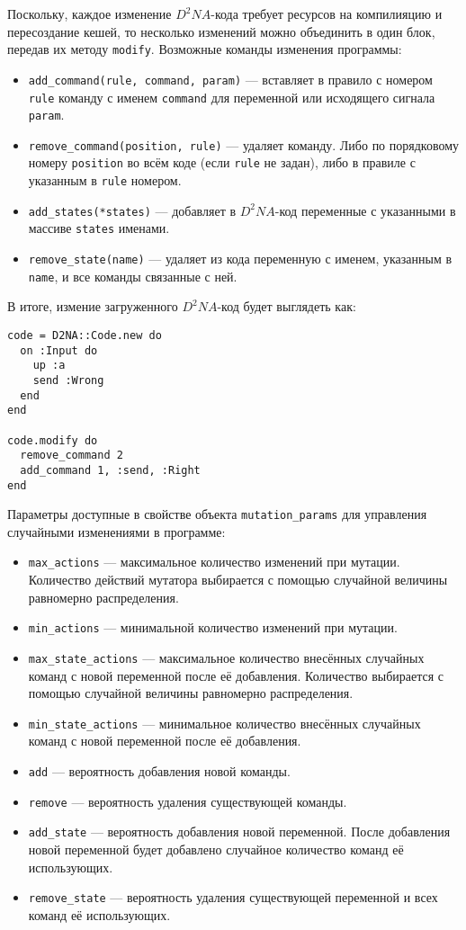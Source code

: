 \documentclass[utf8,a5paper,portrait,10pt,twoside]{eskdtext}
\begin{document}
Поскольку, каждое изменение $D^2NA$-кода требует ресурсов на компилияцию и
пересоздание кешей, то несколько изменений можно объединить в один блок, передав
их методу \texttt{modify}. Возможные команды изменения программы:
\begin{itemize}
  \item \texttt{add\_command(rule, command, param)} — вставляет в
        правило с номером \texttt{rule} команду с именем
        \texttt{command} для переменной или исходящего сигнала
        \texttt{param}.
  \item \texttt{remove\_command(position, rule)} — удаляет команду. Либо по
        порядковому номеру \texttt{position} во всём коде (если \texttt{rule}
        не задан), либо в правиле с указанным в \texttt{rule} номером.
  \item \texttt{add\_states(*states)} — добавляет в $D^2NA$-код переменные с
        указанными в массиве \texttt{states} именами.
  \item \texttt{remove\_state(name)} — удаляет из кода переменную с именем,
        указанным в \texttt{name}, и все команды связанные с ней.
\end{itemize}

В итоге, измение загруженного $D^2NA$-код будет выглядеть как:
\begin{verbatim}
code = D2NA::Code.new do
  on :Input do
    up :a
    send :Wrong
  end
end

code.modify do
  remove_command 2
  add_command 1, :send, :Right
end
\end{verbatim}

Параметры доступные в свойстве объекта \texttt{mutation\_params} для управления
случайными изменениями в программе:

\begin{itemize}
  \item \texttt{max\_actions} — максимальное количество изменений при мутации.
        Количество действий мутатора выбирается с помощью случайной величины
        равномерно распределения.
  \item \texttt{min\_actions} — минимальной количество изменений при мутации.
  \item \texttt{max\_state\_actions} — максимальное количество внесённых
        случайных команд с новой переменной после её добавления. Количество
        выбирается с помощью случайной величины равномерно распределения.
  \item \texttt{min\_state\_actions} — минимальное количество внесённых
        случайных команд с новой переменной после её добавления.
  \item \texttt{add} — вероятность добавления новой команды.
  \item \texttt{remove} — вероятность удаления существующей команды.
  \item \texttt{add\_state} — вероятность добавления новой переменной. После
        добавления новой переменной будет добавлено случайное количество
        команд её использующих.
  \item \texttt{remove\_state} — вероятность удаления существующей переменной и
        всех команд её использующих.
\end{itemize}
\end{document}

